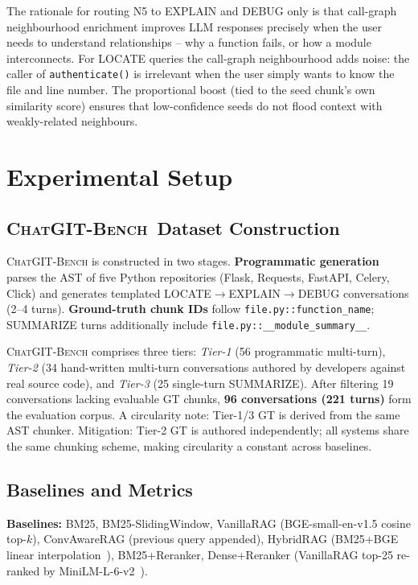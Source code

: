 \documentclass[runningheads]{llncs}
\newcommand{\conv}{\textsc{ChatGIT-Bench}\xspace}
\begin{document}
The rationale for routing N5 to EXPLAIN and DEBUG only is that call-graph
neighbourhood enrichment improves LLM responses precisely when the user
needs to understand relationships -- why a function fails, or how a module
interconnects. For LOCATE queries the call-graph neighbourhood adds noise:
the caller of \texttt{authenticate()} is irrelevant when the user simply
wants to know the file and line number. The proportional boost (tied to the
seed chunk's own similarity score) ensures that low-confidence seeds do not
flood context with weakly-related neighbours.

\FloatBarrier
\section{Experimental Setup}
\label{sec:eval}

\subsection{\conv\ Dataset Construction}

\conv is constructed in two stages. \textbf{Programmatic generation} parses
the AST of five Python repositories (Flask, Requests, FastAPI, Celery, Click)
and generates templated LOCATE$\to$EXPLAIN$\to$DEBUG conversations (2--4 turns).
\textbf{Ground-truth chunk IDs} follow \texttt{file.py::function\_name};
SUMMARIZE turns additionally include \texttt{file.py::\_\_module\_summary\_\_}.

\conv comprises three tiers: \emph{Tier-1} (56 programmatic multi-turn),
\emph{Tier-2} (34 hand-written multi-turn conversations authored by
developers against real source code), and \emph{Tier-3} (25 single-turn
SUMMARIZE). After filtering 19 conversations lacking evaluable GT chunks,
\textbf{96 conversations (221 turns)} form the evaluation corpus.
A circularity note: Tier-1/3 GT is derived from the same AST chunker.
Mitigation: Tier-2 GT is authored independently; all systems share the
same chunking scheme, making circularity a constant across baselines.

\subsection{Baselines and Metrics}

\textbf{Baselines:} BM25, BM25-SlidingWindow, VanillaRAG (BGE-small-en-v1.5
cosine top-$k$), ConvAwareRAG (previous query appended), HybridRAG
(BM25+BGE linear interpolation~\cite{karpukhin2020dense}), BM25+Reranker,
Dense+Reranker (VanillaRAG top-25 re-ranked by MiniLM-L-6-v2~\cite{nogueira2019passage}).
\end{document}
